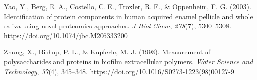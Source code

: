 \documentclass[
]{article}
\newlength{\cslhangindent}
\newlength{\cslentryspacingunit} %
\newenvironment{CSLReferences}[2] %
 {%
  \setlength{\parindent}{0pt}
  \ifodd #1
  \let\oldpar\par
  \def\par{\hangindent=\cslhangindent\oldpar}
  \fi
  \setlength{\parskip}{#2\cslentryspacingunit}
 }%
 {}
\begin{document}
\begin{CSLReferences}{1}{0}
\leavevmode{}%
Yao, Y., Berg, E. A., Costello, C. E., Troxler, R. F., \& Oppenheim, F.
G. (2003). Identification of protein components in human acquired enamel
pellicle and whole saliva using novel proteomics approaches. \emph{J
Biol Chem}, \emph{278}(7), 5300--5308.
\url{https://doi.org/10.1074/jbc.M206333200}

\leavevmode{}%
Zhang, X., Bishop, P. L., \& Kupferle, M. J. (1998). Measurement of
polysaccharides and proteins in biofilm extracellular polymers.
\emph{Water Science and Technology}, \emph{37}(4), 345--348.
\url{https://doi.org/10.1016/S0273-1223(98)00127-9}

\end{CSLReferences}
\end{document}
